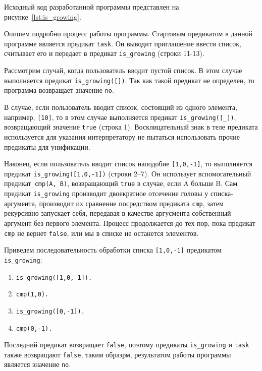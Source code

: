 Исходный код разработанной программы представлен на
рисунке~\ref{lst:is_growing}.



Опишем подробно процесс работы программы.
Стартовым предикатом в данной программе является предикат \texttt{task}.
Он выводит приглашение ввести список, считывает его и передает в предикат
\texttt{is\_growing} (строки 11-13).

Рассмотрим случай, когда пользователь вводит пустой список. 
В этом случае выполняется предикат \texttt{is\_growing([])}.
Так как такой предикат не определен, то программа возвращает значение \texttt{no}.

В случае, если пользователь вводит список, состоящий из одного элемента, 
например, \texttt{[10]}, то в этом случае выполняется предикат \texttt{is\_growing([\_])},
возвращающий значение \texttt{true} (строка 1). 
Восклицательный знак в теле предиката используется для указания
интерпретатору не пытаться использовать прочие предикаты для унификации.

Наконец, если пользователь вводит список наподобие \texttt{[1,0,-1]},
то выполняется предикат \texttt{is\_growing([1,0,-1])} (строки 2--7). 
Он использует вспомогательный предикат~\texttt{cmp(A, B)}, 
возвращающий \texttt{true} в случае, если A больше B.
Сам предикат \texttt{is\_growing} производит двоекратное отсечение головы
у списка-аргумента, производит их сравнение посредством предиката \texttt{cmp},
затем рекурсивно запускает себя, передавая в качестве аргусмента собственный
аргумент без первого элемента. 
Процесс продолжается до тех пор, пока предикат \texttt{cmp} не вернет \texttt{false},
или мы в списке не останется элементов.

Приведем последовательность обработки списка \texttt{[1,0,-1]} предикатом \texttt{is\_growing}:

\begin{enumerate}
\item \texttt{is\_growing([1,0,-1]).}
\item \texttt{cmp(1,0).}
\item \texttt{is\_growing([0,-1]).}
\item \texttt{cmp(0,-1).}
\end{enumerate}

Последний предикат возвращает \texttt{false}, 
поэтому предикаты \texttt{is\_growing} и \texttt{task} также возвращают \texttt{false},
таким образрм, результатом работы программы является значение \texttt{no}.

